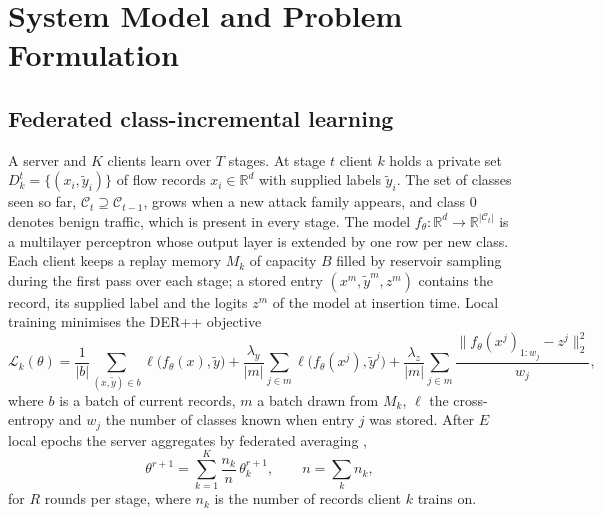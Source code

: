 \documentclass[pdflatex,sn-mathphys-num]{sn-jnl}
\theoremstyle{thmstyleone}
\theoremstyle{thmstylethree}
\begin{document}
\section{System Model and Problem Formulation}\label{sec:model}
\subsection{Federated class-incremental learning}
A server and $K$ clients learn over $T$ stages. At stage $t$ client $k$ holds a private set $D_k^t=\{(x_i,\tilde y_i)\}$ of flow records $x_i\in\mathbb{R}^d$ with supplied labels $\tilde y_i$. The set of classes seen so far, $\mathcal{C}_t\supseteq\mathcal{C}_{t-1}$, grows when a new attack family appears, and class $0$ denotes benign traffic, which is present in every stage. The model $f_\theta:\mathbb{R}^d\to\mathbb{R}^{|\mathcal{C}_t|}$ is a multilayer perceptron whose output layer is extended by one row per new class. Each client keeps a replay memory $M_k$ of capacity $B$ filled by reservoir sampling \cite{vitter} during the first pass over each stage; a stored entry $(x^m,\tilde y^m,z^m)$ contains the record, its supplied label and the logits $z^m$ of the model at insertion time. Local training minimises the DER++ objective \cite{der}
\begin{equation}
\mathcal{L}_k(\theta)=\frac{1}{|b|}\sum_{(x,\tilde y)\in b}\ell\big(f_\theta(x),\tilde y\big)+\frac{\lambda_y}{|m|}\sum_{j\in m}\ell\big(f_\theta(x^j),\tilde y^j\big)+\frac{\lambda_z}{|m|}\sum_{j\in m}\frac{\|f_\theta(x^j)_{1:w_j}-z^j\|_2^2}{w_j},
\label{eq:der}
\end{equation}
where $b$ is a batch of current records, $m$ a batch drawn from $M_k$, $\ell$ the cross-entropy and $w_j$ the number of classes known when entry $j$ was stored. After $E$ local epochs the server aggregates by federated averaging \cite{fedavg},
\begin{equation}
\theta^{r+1}=\sum_{k=1}^{K}\frac{n_k}{n}\,\theta_k^{r+1},\qquad n=\sum_k n_k,
\label{eq:fedavg}
\end{equation}
for $R$ rounds per stage, where $n_k$ is the number of records client $k$ trains on.
\end{document}
